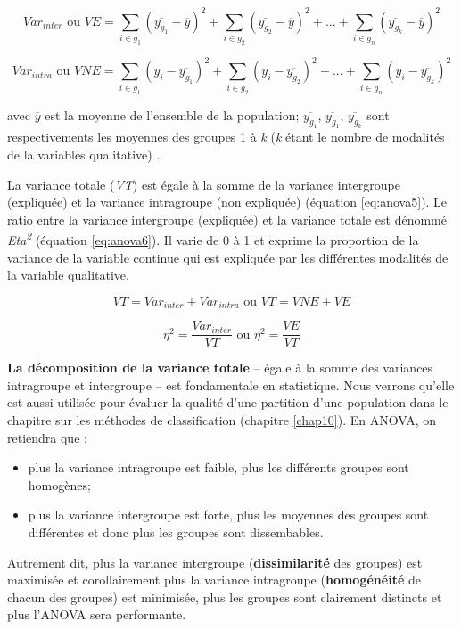 \documentclass[
  11pt,
  french,
]{book}
\makeatletter
\providecommand{\tightlist}{%
  \setlength{\itemsep}{0pt}\setlength{\parskip}{0pt}}
\newenvironment{kframev}{%
\medskip{}
\setlength{\fboxsep}{.8em}
 \def\at@end@of@kframev{}%
 \ifinner\ifhmode%
  \def\at@end@of@kframev{\end{minipage}}%
  \begin{minipage}{\columnwidth}%
 \fi\fi%
 \def\FrameCommand##1{\hskip\@totalleftmargin \hskip-\fboxsep
 \colorbox{shadebluecolor}{##1}\hskip-\fboxsep
     \hskip-\linewidth \hskip-\@totalleftmargin \hskip\columnwidth}%
 \MakeFramed {\advance\hsize-\width
   \@totalleftmargin\z@ \linewidth\hsize
   \@setminipage}}%
 {\par\unskip\endMakeFramed%
 \at@end@of@kframev}
\newenvironment{rmdblock}[1]
  {
  \begin{itemize}
  \renewcommand{\labelitemi}{
    \raisebox{-.7\height}[0pt][0pt]{
      {\setkeys{Gin}{width=3em,keepaspectratio}\texttt{[image: images/\#1]}}
    }
  }
  \setlength{\fboxsep}{1em}
  \begin{kframev}
  \small
  \item
  }
  {
  \end{kframev}
  \end{itemize}
  }
\newenvironment{bloc_astuce}
  {\begin{rmdblock}{astuce}}
  {\end{rmdblock}}
\makeatother
\begin{document}
\begin{equation} 
Var_{inter} \mbox{ ou } VE=\sum_{i\in{g_1}}(\overline{y_{g_1}}-\overline{y})^2 + \sum_{i\in{g_2}}(\overline{y_{g_2}}-\overline{y})^2 + ... + \sum_{i\in{g_n}}(\overline{y_{g_k}}-\overline{y})^2
\label{eq:anova2}
\end{equation}

\begin{equation} 
Var_{intra} \mbox{ ou } VNE=\sum_{i\in{g_1}}(y_{i}-\overline{y_{g_1}})^2 + \sum_{i\in{g_2}}(y_{i}-\overline{y_{g_2}})^2 + ... + \sum_{i\in{g_n}}(y_{i}-\overline{y_{g_k}})^2 
\label{eq:anova3}
\end{equation}

avec \(\overline{y}\) est la moyenne de l'ensemble de la population; \(\overline{y_{g_1}}\), \(\overline{y_{g_1}}\), \(\overline{y_{g_k}}\) sont respectivements les moyennes des groupes 1 à \emph{k} (\emph{k} étant le nombre de modalités de la variables qualitative) .

La variance totale (\emph{VT}) est égale à la somme de la variance intergroupe (expliquée) et la variance intragroupe (non expliquée) (équation \eqref{eq:anova5}). Le ratio entre la variance intergroupe (expliquée) et la variance totale est dénommé \emph{Eta\textsuperscript{2}} (équation \eqref{eq:anova6}). Il varie de 0 à 1 et exprime la proportion de la variance de la variable continue qui est expliquée par les différentes modalités de la variable qualitative.

\begin{equation} 
VT = Var_{inter} + Var_{intra} \mbox{ ou } VT = VNE + VE
\label{eq:anova5}
\end{equation}

\begin{equation} 
\eta^2= \frac{Var_{inter}}{VT} \mbox{ ou }  \eta^2= \frac{VE}{VT}
\label{eq:anova6}
\end{equation}

\begin{bloc_astuce}

\textbf{La décomposition de la variance totale} -- égale à la somme des variances intragroupe et intergroupe -- est fondamentale en statistique. Nous verrons qu'elle est aussi utilisée pour évaluer la qualité d'une partition d'une population dans le chapitre sur les méthodes de classification (chapitre \ref{chap10}). En ANOVA, on retiendra que :

\begin{itemize}
\tightlist
\item
  plus la variance intragroupe est faible, plus les différents groupes sont homogènes;
\item
  plus la variance intergroupe est forte, plus les moyennes des groupes sont différentes et donc plus les groupes sont dissembables.
\end{itemize}

Autrement dit, plus la variance intergroupe (\textbf{dissimilarité} des groupes) est maximisée et corollairement plus la variance intragroupe (\textbf{homogénéité} de chacun des groupes) est minimisée, plus les groupes sont clairement distincts et plus l'ANOVA sera performante.

\end{bloc_astuce}
\end{document}
